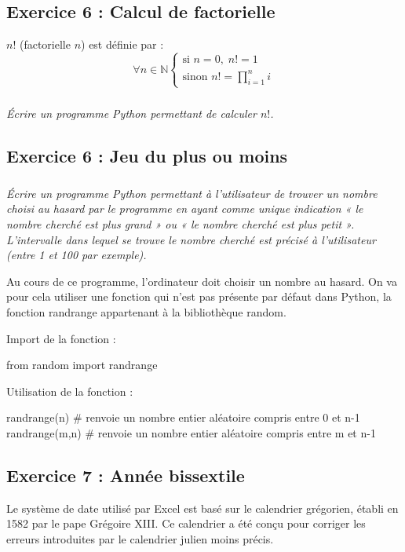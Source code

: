 \documentclass[10pt]{article}
\begin{document}
\subsection*{Exercice 6 : Calcul de factorielle}
$n!$ (factorielle $n$) est définie par :
$$
\forall n\in \mathbb{N} \left\{
\begin{array}{l}
\text{si } n=0, \; n! = 1 \\
\text{sinon } n! = \prod\limits_{i=1}^n i 
\end{array}
\right.
$$

\subparagraph*{}
\textit{Écrire un programme Python permettant de calculer $n!$.}


\subsection*{Exercice 6 : Jeu du plus ou moins}
\setcounter{subparagraph}{0}

\subparagraph*{}
\textit{Écrire un programme Python permettant à l’utilisateur de trouver un nombre choisi au hasard par le programme en ayant comme unique indication « le nombre cherché est plus grand » ou « le nombre cherché est plus petit ». L’intervalle dans lequel se trouve le nombre cherché est précisé à l’utilisateur (entre 1 et 100 par exemple).}

\begin{py}
Au cours de ce programme, l’ordinateur doit choisir un nombre au hasard. On va pour cela utiliser une fonction qui n’est pas présente par défaut dans Python, la fonction randrange appartenant à la bibliothèque random.

Import de la fonction :
\begin{python}
from random import randrange
\end{python}
Utilisation de la fonction :
\begin{python}
randrange(n) # renvoie un nombre entier aléatoire compris entre 0 et n-1
randrange(m,n) # renvoie un nombre entier aléatoire compris entre m et n-1
\end{python}
\end{py}



\subsection*{Exercice 7 : Année bissextile}
\setcounter{subparagraph}{0}

Le système de date utilisé par Excel est basé sur le calendrier grégorien, établi en 1582 par le pape Grégoire XIII. Ce calendrier a été conçu pour corriger les erreurs introduites par le calendrier julien moins précis.
\end{document}
